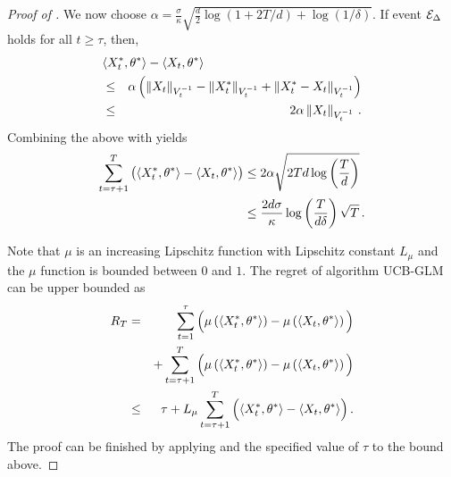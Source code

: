 \begin{proof}[Proof of ]

We now choose $\alpha=\frac{\sigma}{\kappa} \sqrt{\frac{d}{2} \log(1+2T/d) + \log(1/\delta)}$.  If event $\mathcal{E}_\Delta$ holds for all $t \ge \tau$, then,
\begin{eqnarray*}
\lefteqn{\iprod{X_t^*}{\theta^*} - \iprod{X_t}{\theta^*}} \\
&\le& \alpha \left( \norm{X_t}_{V_t^{-1}} -  \norm{X_t^*}_{V_t^{-1}} + \norm{X_t^*-X_t}_{V_t^{-1}} \right) \\
&\le& 2\alpha \norm{X_t}_{V_t^{-1}}\,.
\end{eqnarray*}
Combining the above with  yields
\begin{align}
\sum_{t=\tau+1}^{T} \big(\langle X_t^*, \theta^* \rangle - \langle X_t, \theta^* \rangle\big) &\le  2\alpha \sqrt{2Td\log \left( \frac{T}{d}\right)} \nonumber \\
&\le
\frac{2d\sigma}{\kappa} \log\left(\frac{T}{d\delta}\right)\sqrt{T}\,.
\label{eqn:ucbglm-phase2-bound}
\end{align}
%

Note that $\mu$ is an increasing Lipschitz function with Lipschitz constant $L_\mu$ and the $\mu$ function is bounded between $0$ and $1$. The regret of algorithm UCB-GLM can be upper bounded as
\begin{eqnarray*}
R_T
&=& \sum_{t=1}^{\tau} \Big( \mu \left(\langle X_t^*, \theta^* \rangle\right) -   \mu \left(\langle X_t, \theta^* \rangle\right) \Big) \\
&& + \sum_{t=\tau+1}^{T} \Big(\mu \left(\langle X_t^*, \theta^* \rangle\right) - \mu \left(\langle X_t, \theta^* \rangle \right)\Big) \\
&\le & \tau  + L_{\mu} \sum_{t=\tau+1}^{T} \Big( \langle X_t^*, \theta^* \rangle - \langle X_t, \theta^* \rangle \Big)\,.
\end{eqnarray*}
The proof can be finished by applying  and the specified value of $\tau$ to the bound above.
\end{proof}

